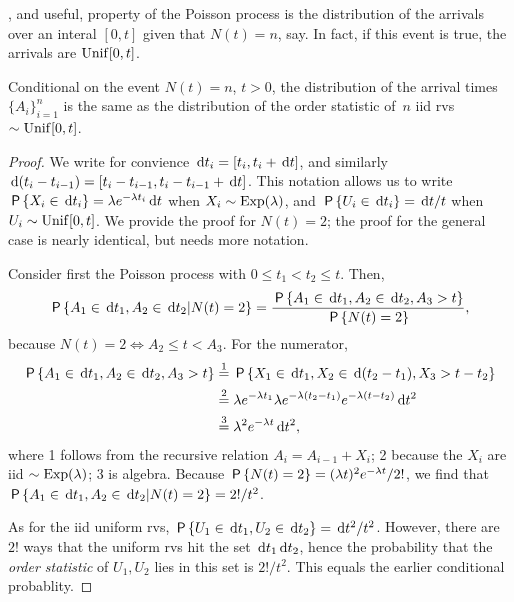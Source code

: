 \documentclass[stochastic-or.tex]{subfiles}
\begin{document}
, and useful, property of the Poisson process is the distribution of the arrivals over an interal $[0,t]$ given that $N(t) = n$, say.
In fact, if this event is true, the arrivals are $\Unif{[0,t]}$.
\begin{theorem}\label{thr:1}
Conditional on the event $N(t)=n$, $t>0$, the distribution of the arrival times $\{A_{i}\}_{i=1}^{n}$ is the same as the distribution of the order statistic of~$n$ iid rvs $\sim \Unif{[0,t]}$.
\end{theorem}
\begin{proof}
We write for convience $\d t_i = [t_{i}, t_i + \d t]$, and similarly $\d(t_i-t_{i-1}) = [t_i-t_{i-1}, t_i-t_{i-1}+\d t]$. This notation allows us to write $\P{X_i \in \d t_i} = \lambda e^{-\lambda t_i} \d t$ when $X_i\sim \Exp{\lambda}$, and $\P{U_i\in \d t_i } = \d t /t$ when $U_i\sim \Unif{[0,t]}$.
We provide the proof for $N(t)=2$; the proof for the general case is nearly identical, but needs more notation.

Consider first the Poisson process with $0\leq t_1<t_2 \leq  t$. Then,
\begin{align*}
  \P{A_1\in \d t_1, A_2\in \d t_2 | N(t)=2}
= \frac{\P{A_1\in \d t_1, A_2\in \d t_2, A_3 > t}}{\P{N(t)=2}},
\end{align*}
because $N(t) = 2 \iff A_{2} \leq t < A_{3}$.
For the numerator,
\begin{align*}
\P{A_1\in \d t_1, A_2\in \d t_2, A_3 > t}
  &\stackrel1= \P{X_1\in \d t_1, X_2\in \d (t_2-t_1), X_3 > t-t_{2}} \\
  &\stackrel2= \lambda e^{-\lambda t_1} \lambda e^{-\lambda (t_2-t_1)} e^{-\lambda (t-t_2)} \d t^{2}  \\
  &\stackrel3= \lambda^{2} e^{-\lambda t} \d  t^{2},
\end{align*}
where  1 follows from the recursive relation  $A_{i} = A_{i-1} + X_{i}$; 2 because the $X_i$ are iid  $\sim \Exp{\lambda}$; 3 is algebra.
Because $\P{N(t)=2} = (\lambda t)^2 e^{-\lambda t}/2!$, we find that
$ \P{A_1\in \d t_1, A_2\in \d t_2 | N(t)=2} =  2!/t^{2}$.

As for the iid uniform rvs, $\P{U_1\in \d t_1, U_2\in \d t_2} = \d t^2/ t^{2}$.
However, there are $2!$ ways that the uniform rvs hit the set $\d t_1 \d t_{2}$, hence the probability that the \emph{order statistic} of $U_{1}, U_2$ lies in this set is $2!/t^{2}$.
This equals the earlier conditional probablity.
\end{proof}
\end{document}
